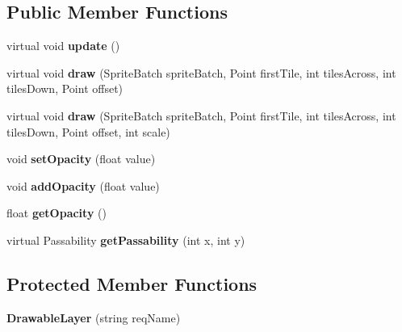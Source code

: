 \subsection*{Public Member Functions}
\begin{DoxyCompactItemize}
\item 
\hypertarget{class_simple_r_p_g_1_1_drawable_layer_a0803d17ddf796c736412a3ec9b099bea}{virtual void {\bfseries update} ()}\label{class_simple_r_p_g_1_1_drawable_layer_a0803d17ddf796c736412a3ec9b099bea}

\item 
\hypertarget{class_simple_r_p_g_1_1_drawable_layer_abf1e9fa363dd592d5c01935e46bcd71e}{virtual void {\bfseries draw} (Sprite\+Batch sprite\+Batch, Point first\+Tile, int tiles\+Across, int tiles\+Down, Point offset)}\label{class_simple_r_p_g_1_1_drawable_layer_abf1e9fa363dd592d5c01935e46bcd71e}

\item 
\hypertarget{class_simple_r_p_g_1_1_drawable_layer_af4129d9ebd2e139ccaf2618b0c93e1bb}{virtual void {\bfseries draw} (Sprite\+Batch sprite\+Batch, Point first\+Tile, int tiles\+Across, int tiles\+Down, Point offset, int scale)}\label{class_simple_r_p_g_1_1_drawable_layer_af4129d9ebd2e139ccaf2618b0c93e1bb}

\item 
\hypertarget{class_simple_r_p_g_1_1_drawable_layer_a87911cd99c0a4d379d0c3f1c2f0af84c}{void {\bfseries set\+Opacity} (float value)}\label{class_simple_r_p_g_1_1_drawable_layer_a87911cd99c0a4d379d0c3f1c2f0af84c}

\item 
\hypertarget{class_simple_r_p_g_1_1_drawable_layer_a2267e4b442be555ea7386e83295e832a}{void {\bfseries add\+Opacity} (float value)}\label{class_simple_r_p_g_1_1_drawable_layer_a2267e4b442be555ea7386e83295e832a}

\item 
\hypertarget{class_simple_r_p_g_1_1_drawable_layer_a8891ce4a9e4d5fbfa993cb6b0073dfbf}{float {\bfseries get\+Opacity} ()}\label{class_simple_r_p_g_1_1_drawable_layer_a8891ce4a9e4d5fbfa993cb6b0073dfbf}

\item 
\hypertarget{class_simple_r_p_g_1_1_drawable_layer_adb33676bd4d70ddec74667c74f4e0c0e}{virtual Passability {\bfseries get\+Passability} (int x, int y)}\label{class_simple_r_p_g_1_1_drawable_layer_adb33676bd4d70ddec74667c74f4e0c0e}

\end{DoxyCompactItemize}
\subsection*{Protected Member Functions}
\begin{DoxyCompactItemize}
\item 
\hypertarget{class_simple_r_p_g_1_1_drawable_layer_a015e72b02bc28151e2d42e6d22420c00}{{\bfseries Drawable\+Layer} (string req\+Name)}\label{class_simple_r_p_g_1_1_drawable_layer_a015e72b02bc28151e2d42e6d22420c00}

\end{DoxyCompactItemize}
